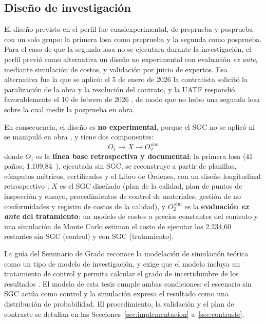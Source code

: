 \subsection{Diseño de investigación}
El diseño previsto en el perfil fue cuasiexperimental, de preprueba y posprueba con un solo grupo: la primera losa como preprueba y la segunda como posprueba. Para el caso de que la segunda losa no se ejecutara durante la investigación, el perfil previó como alternativa un diseño no experimental con evaluación \emph{ex ante}, mediante simulación de costos, y validación por juicio de expertos. Esa alternativa fue la que se aplicó: el 5 de enero de 2026 la contratista solicitó la paralización de la obra y la resolución del contrato, y la UATF respondió favorablemente el 10 de febrero de 2026 \parencite[pp.~1, 14]{uatf_item13}, de modo que no hubo una segunda losa sobre la cual medir la posprueba en obra.

En consecuencia, el diseño es \textbf{no experimental}, porque el SGC no se aplicó ni se manipuló en obra \parencite[pp.~151, 175]{hernandez2018}, y tiene dos componentes:
\begin{equation*}
  O_1 \longrightarrow X \longrightarrow O_2^{\,\text{sim}}
\end{equation*}
donde $O_1$ es la \textbf{línea base retrospectiva y documental}: la primera losa (41 paños; 1.109,84~\mdos{}), ejecutada sin SGC, se reconstruye a partir de planillas, cómputos métricos, certificados y el Libro de Órdenes, con un diseño longitudinal retrospectivo \parencite[p.~180]{hernandez2018}; $X$ es el SGC diseñado (plan de la calidad, plan de puntos de inspección y ensayo, procedimientos de control de materiales, gestión de no conformidades y registro de costos de la calidad), y $O_2^{\,\text{sim}}$ es la \textbf{evaluación \emph{ex ante} del tratamiento}: un modelo de costos a precios constantes del contrato y una simulación de Monte Carlo estiman el costo de ejecutar los 2.234,60~\mdos{} restantes sin SGC (control) y con SGC (tratamiento).

La guía del Seminario de Grado reconoce la modelación de simulación teórica como un tipo de modelo de investigación, y exige que el modelo incluya un tratamiento de control y permita calcular el grado de incertidumbre de los resultados \parencite[diapositivas~4, 8 y 9]{barrios2021modelo}. El modelo de esta tesis cumple ambas condiciones: el escenario sin SGC actúa como control y la simulación expresa el resultado como una distribución de probabilidad. El procedimiento, la validación y el plan de contraste se detallan en las Secciones~\ref{sec:implementacion} a~\ref{sec:contraste}.

